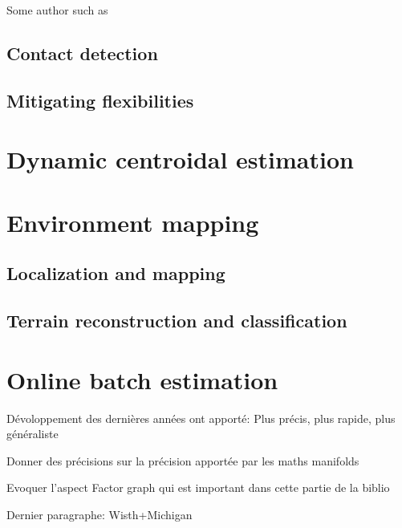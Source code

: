 Some author such as \cite{bloesch2013stateSlippery, bledt2018cheetah, }


\subsection{Contact detection}

\subsection{Mitigating flexibilities}



\section{Dynamic centroidal estimation}



\section{Environment mapping}
\subsection{Localization and mapping}
\subsection{Terrain reconstruction and classification}



\section{Online batch estimation}

Dévoloppement des dernières années ont apporté:
Plus précis, plus rapide, plus généraliste

Donner des précisions sur la précision apportée par les maths manifolds

Evoquer l'aspect Factor graph qui est important dans cette partie de la biblio

Dernier paragraphe: Wisth+Michigan


